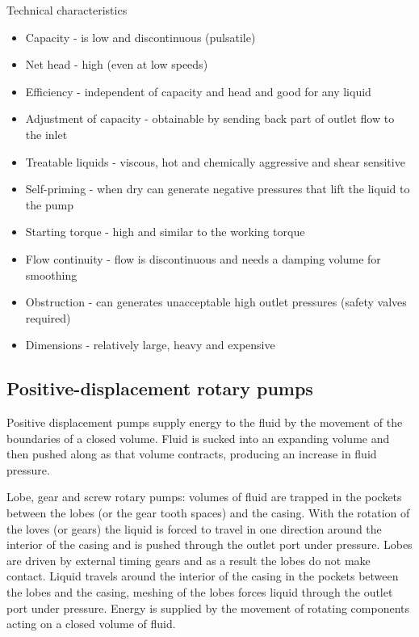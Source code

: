 \documentclass[class=report, crop=false, 12pt,a4paper]{standalone}
\begin{document}
Technical characteristics
\begin{itemize}
  \item Capacity - is low and discontinuous (pulsatile)
  \item Net head - high (even at low speeds)
  \item Efficiency - independent of capacity and head and good for any liquid
  \item Adjustment of capacity - obtainable by sending back part of outlet flow to the inlet
  \item Treatable liquids - viscous, hot and chemically aggressive and shear sensitive
  \item Self-priming - when dry can generate negative pressures that lift the liquid to the pump
  \item Starting torque - high and similar to the working torque
  \item Flow continuity - flow is discontinuous and needs a damping volume for smoothing
  \item Obstruction - can generates unacceptable high outlet pressures (safety valves required)
  \item Dimensions - relatively large, heavy and expensive
\end{itemize}
\subsection{Positive-displacement rotary pumps}
Positive displacement pumps supply energy to the fluid by the movement of the boundaries of a closed volume. Fluid is sucked into an expanding volume and then pushed along as that volume contracts, producing an increase in fluid pressure.

Lobe, gear and screw rotary pumps: volumes of fluid are trapped in the pockets between the lobes (or the gear tooth spaces) and the casing. With the rotation of the loves (or gears) the liquid is forced to travel in one direction around the interior of the casing and is pushed through the outlet port under pressure. Lobes are driven by external timing gears and as a result the lobes do not make contact. Liquid travels around the interior of the casing in the pockets between the lobes and the casing, meshing of the lobes forces liquid through the outlet port under pressure. Energy is supplied by the movement of rotating components acting on a closed volume of fluid. 
\end{document}
